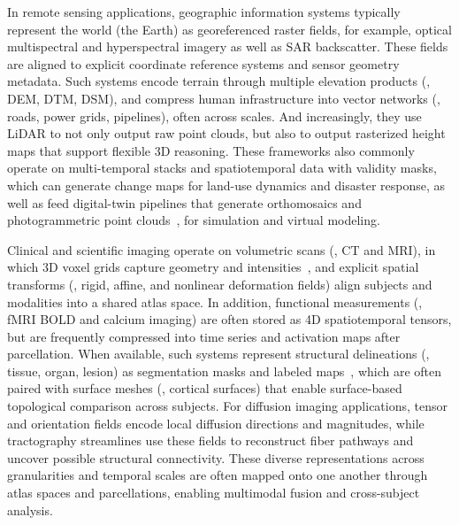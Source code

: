 In remote sensing applications, geographic information systems typically represent the world (the Earth) as georeferenced raster fields, for example, optical multispectral and hyperspectral imagery as well as SAR backscatter. 
These fields are aligned to explicit coordinate reference systems and sensor geometry metadata. 
Such systems encode terrain through multiple elevation products (\eg, DEM, DTM, DSM), and compress human infrastructure into vector networks (\eg, roads, power grids, pipelines), often across scales. 
And increasingly, they use LiDAR to not only output raw point clouds, but also to output rasterized height maps that support flexible 3D reasoning. 
These frameworks also commonly operate on multi-temporal stacks and spatiotemporal data with validity masks, which can generate change maps for land-use dynamics and disaster response, as well as feed digital-twin pipelines that generate orthomosaics and photogrammetric point clouds~\cite{schonberger2016structure}, for simulation and virtual modeling.

Clinical and scientific imaging operate on volumetric scans (\eg, CT and MRI), in which 3D voxel grids capture geometry and intensities~\cite{cciccek20163d}, and explicit spatial transforms (\eg, rigid, affine, and nonlinear deformation fields) align subjects and modalities into a shared atlas space. 
In addition, functional measurements (\eg, fMRI BOLD and calcium imaging) are often stored as 4D spatiotemporal tensors, but are frequently compressed into time series and activation maps after parcellation. 
When available, such systems represent structural delineations (\eg, tissue, organ, lesion) as segmentation masks and labeled maps~\cite{ronneberger2015unet}, which are often paired with surface meshes (\eg, cortical surfaces) that enable surface-based topological comparison across subjects. 
For diffusion imaging applications, tensor and orientation fields encode local diffusion directions and magnitudes, while tractography streamlines use these fields to reconstruct fiber pathways and uncover possible structural connectivity. 
These diverse representations across granularities and temporal scales are often mapped onto one another through atlas spaces and parcellations, enabling multimodal fusion and cross-subject analysis.

